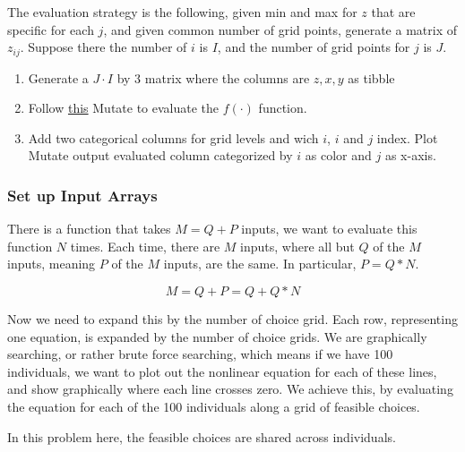 \documentclass[
]{book}
\providecommand{\tightlist}{%
  \setlength{\itemsep}{0pt}\setlength{\parskip}{0pt}}
\begin{document}
The evaluation strategy is the following, given min and max for \(z\) that are specific for each \(j\), and given common number of grid points, generate a matrix of \(z_{ij}\). Suppose there the number of \(i\) is \(I\), and the number of grid points for \(j\) is \(J\).

\begin{enumerate}
\def\labelenumi{\arabic{enumi}.}
\tightlist
\item
  Generate a \(J \cdot I\) by \(3\) matrix where the columns are \(z,x,y\) as tibble
\item
  Follow \href{https://fanwangecon.github.io/R4Econ/function/mutatef/fs_funceval.html}{this} Mutate to evaluate the \(f(\cdot)\) function.
\item
  Add two categorical columns for grid levels and wich \(i\), \(i\) and \(j\) index. Plot Mutate output evaluated column categorized by \(i\) as color and \(j\) as x-axis.
\end{enumerate}

\hypertarget{set-up-input-arrays-1}{%
\subsubsection{Set up Input Arrays}\label{set-up-input-arrays-1}}

There is a function that takes \(M=Q+P\) inputs, we want to evaluate this function \(N\) times. Each time, there are \(M\) inputs, where all but \(Q\) of the \(M\) inputs, meaning \(P\) of the \(M\) inputs, are the same. In particular, \(P=Q*N\).

\[M = Q+P = Q + Q*N\]

Now we need to expand this by the number of choice grid. Each row, representing one equation, is expanded by the number of choice grids. We are graphically searching, or rather brute force searching, which means if we have 100 individuals, we want to plot out the nonlinear equation for each of these lines, and show graphically where each line crosses zero. We achieve this, by evaluating the equation for each of the 100 individuals along a grid of feasible choices.

In this problem here, the feasible choices are shared across individuals.
\end{document}
